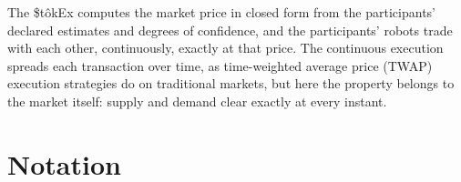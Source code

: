 \documentclass[letterpaper]{article}
\newcommand{\StokEx}{\$t\^{o}kEx}
\begin{document}
The \StokEx{} computes the market price in closed form from the participants' declared estimates and degrees of confidence, and the participants' robots trade with each other, continuously, exactly at that price. The continuous execution spreads each transaction over time, as time-weighted average price (TWAP) execution strategies do on traditional markets, but here the property belongs to the market itself: supply and demand clear exactly at every instant.

\clearpage
\section{Notation}
\end{document}
